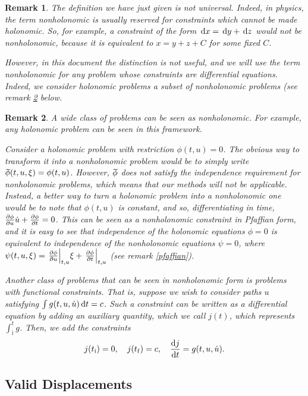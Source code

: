 \documentclass{article}
\theoremstyle{plain}
\theoremstyle{plain}
\newtheorem{remark}{Remark}
\theoremstyle{nonumberplain}
\theoremstyle{empty}
\newcommand{\tstart}{\mathrm{i}}
\newcommand{\tend}{\mathrm{f}}
\newcommand{\wtphi}{
  \mspace{2mu}
  \widetilde{\mspace{-2mu}\smash[t]{\phi}}
}
\DeclarePairedDelimiter\eval{.}{\rvert}
\begin{document}
\begin{remark}
The definition we have just given is not universal. Indeed, in physics, the term nonholonomic is usually reserved for constraints which \emph{cannot} be made holonomic. So, for example, a constraint of the form $\dl x = \dl y + \dl z$ would not be nonholonomic, because it is equivalent to $x = y + z + C$ for some fixed $C$.

However, in this document the distinction is not useful, and we will use the term nonholonomic for any problem whose constraints are differential equations. Indeed, we consider holonomic problems a subset of nonholonomic problems (see remark \ref{nonholoaregeneral} below.
\end{remark}

\begin{remark}\label{nonholoaregeneral}
A wide class of problems can be seen as nonholonomic. For example, any holonomic problem can be seen in this framework.

Consider a holonomic problem with restriction $\phi(t,u) = 0$. The obvious way to transform it into a nonholonomic problem would be to simply write $\wtphi(t,u,\xi) = \phi(t,u)$. However, $\wtphi$ does not satisfy the independence requirement for nonholonomic problems, which means that our methods will not be applicable. Instead, a better way to turn a holonomic problem into a nonholonomic one would be to note that $\phi(t,u)$ is constant, and so, differentiating in time, $\diffp \phi u \dot u + \diffp \phi t = 0$. This can be seen as a nonholonomic constraint in Pfaffian form, and it is easy to see that independence of the holonomic equations $\phi = 0$ is equivalent to independence of the nonholonomic equations $\psi = 0$, where $\psi(t,u,\xi) = \eval*{\diffp \phi u}_{t,u} \xi + \eval*{\diffp \phi t}_{t,u}$ (see remark \ref{pfaffian}).

Another class of problems that can be seen in nonholonomic form is problems with functional constraints. That is, suppose we wish to consider paths $u$ satisfying $\int g(t,u,\dot u) \dl t = c$. Such a constraint can be written as a differential equation by adding an auxiliary quantity, which we call $j(t)$, which represents $\int_\tstart^t g$. Then, we add the constraints
\[j(t_\tstart) = 0, \quad j(t_\tend) = c, \quad \diff j t = g(t,u,\dot u).\]
\end{remark}

\subsection{Valid Displacements}\label{validdisplacements}
\end{document}
